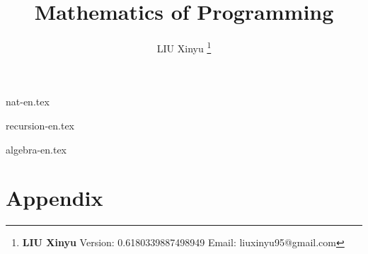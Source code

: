 \documentclass[UTF8, a4paper,twoside]{book} %
\begin{document}


\title{{\bf \Huge Mathematics of Programming}
  \centering
            }

\author{LIU Xinyu
  \thanks{{\bfseries LIU Xinyu} \newline
    Version: 0.6180339887498949 \newline
    Email: liuxinyu95@gmail.com \newline
    }}

\maketitle


\tableofcontents
\newpage

{nat-en.tex}

{recursion-en.tex}

{algebra-en.tex}


\part{Appendix}
\appendix
\noappendicestocpagenum
\addappheadtotoc


%

\printindex
\end{document}
